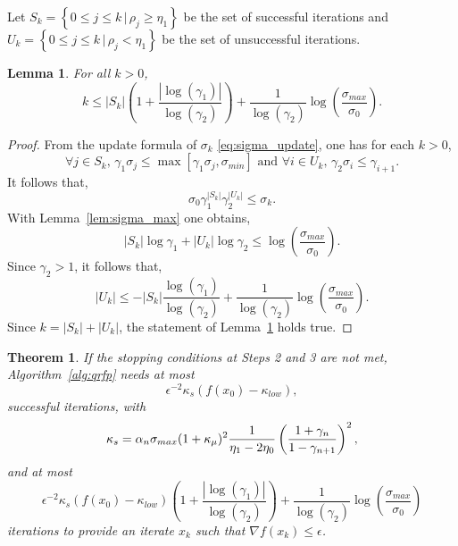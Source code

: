 \documentclass{article}[12pt]
\newtheorem{lemma}[]{Lemma}
\newtheorem{theorem}[]{Theorem}
\begin{document}
	Let $S_k = \left\{0\leq j\leq k\,|\,\rho_j\geq \eta_1\right\}$ be the set of successful iterations and $U_k = \left\{0\leq j\leq k\,|\,\rho_j< \eta_1\right\}$ be the set of unsuccessful iterations.

	\begin{lemma}
		\label{lem:k_bounded}
		For all $k>0$, 
		\begin{equation}
			k \leq |S_k|\left(1+\dfrac{|\log(\gamma_1)|}{\log(\gamma_2)}\right) +\dfrac{1}{\log(\gamma_2)}\log\left(\dfrac{\sigma_{max}}{\sigma_0}\right).
		\end{equation}
	\end{lemma}

	\begin{proof}
		From the update formula of $\sigma_k$ \eqref{eq:sigma_update}, one has for each $k>0$,
		\begin{equation*}
			\forall j \in S_k,\, \gamma_1\sigma_j\leq \max\left[\gamma_1\sigma_j,\sigma_{min} \right]\text{ and } \forall i\in U_k,\, \gamma_2\sigma_i \leq \gamma_{i+1}.
		\end{equation*}
	It follows that,
	\begin{equation}
		\sigma_0\gamma_1^{|S_k|}\gamma_2^{|U_k|}\leq \sigma_k.
	\end{equation}
    With Lemma~\ref{lem:sigma_max} one obtains,
    \begin{equation}
    |S_k|\log{\gamma_1}+|U_k|\log{\gamma_2}\leq \log\left(\dfrac{\sigma_{max}}{\sigma_0}\right).
    \end{equation}
	Since $\gamma_2>1$, it follows that,
	\begin{equation}
		|U_k| \leq -|S_k|\dfrac{\log(\gamma_1)}{\log(\gamma_2)} +\dfrac{1}{\log(\gamma_2)}\log\left(\dfrac{\sigma_{max}}{\sigma_0}\right).
	\end{equation}
    Since $k = |S_k|+|U_k|$, the statement of Lemma~\ref{lem:k_bounded} holds true.
	\end{proof}

	\begin{theorem}
		\label{th:complexity}
		If the stopping conditions at Steps 2 and 3 are not met, Algorithm~\ref{alg:qrfp} needs at most
		\begin{equation*}
			\epsilon^{-2}\kappa_s(f(x_0)-\kappa_{low}),
		\end{equation*}
	successful iterations, with 
	\begin{equation}
		\kappa_s=\alpha_n\sigma_{max}(1+\kappa_\mu)^2 \dfrac{1}{\eta_1-2\eta_0}\left(\dfrac{1+\gamma_n}{1-\gamma_{n+1}}\right)^2,
	\end{equation} and at most  
	\begin{equation*}
		\epsilon^{-2}\kappa_s(f(x_0)-\kappa_{low}) \left(1+\dfrac{|\log(\gamma_1)|}{\log(\gamma_2)}\right) +\dfrac{1}{\log(\gamma_2)}\log\left(\dfrac{\sigma_{max}}{\sigma_0}\right)
	\end{equation*}
	iterations to provide an iterate $x_k$ such that $\nabla f(x_k)\leq \epsilon$.
	\end{theorem}
\end{document}

